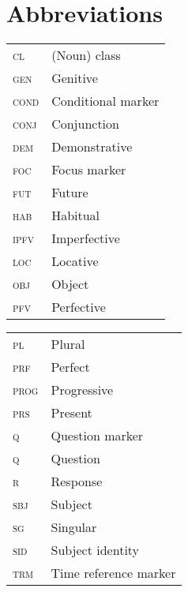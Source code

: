 \documentclass[output=paper,colorlinks,citecolor=brown]{langscibook}
\begin{document}
\section*{Abbreviations}
\begin{minipage}[t][][b]{.45\textwidth}
	\begin{tabularx}{\textwidth}{>{\scshape}lQ}
		cl & (Noun) class\\
		gen & Genitive\\
		cond & Conditional marker\\
		conj & Conjunction\\
		dem & Demonstrative\\
		foc & Focus marker\\
		fut & Future\\
		hab & Habitual\\
		ipfv & Imperfective\\
		loc & Locative\\
		obj & Object\\
		pfv & Perfective\\
	\end{tabularx}
\end{minipage}%
\begin{minipage}[t][][b]{.45\textwidth}
	\begin{tabularx}{\textwidth}{>{\scshape}lQ}
		pl & Plural\\
		prf & Perfect\\
		prog & Progressive\\
		prs & Present\\
		q & Question marker\\
		q & Question\\
		r & Response\\
		sbj & Subject\\
		sg & Singular\\
		sid & Subject identity\\
		trm & Time reference marker\\
	\end{tabularx}
\end{minipage}%






{\sloppy\printbibliography[heading=subbibliography,notkeyword=this]}
\end{document}
